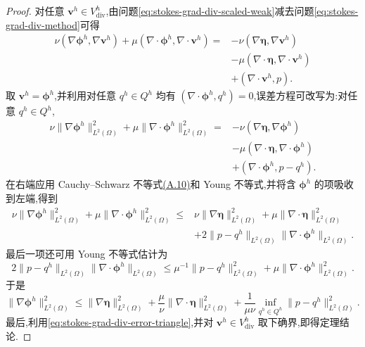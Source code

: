 \begin{proof}
对任意 $\bm{v}^h\in V_{\mathrm{div}}^h$,由问题\cref{eq:stokes-grad-div-scaled-weak}减去问题\cref{eq:stokes-grad-div-method}可得
\begin{align*}
 \nu(\nabla\symbf{\phi}^h,\nabla\bm{v}^h)
  +\mu(\nabla\cdot\symbf{\phi}^h,\nabla\cdot\bm{v}^h)
 ={}&-\nu(\nabla\symbf{\eta},\nabla\bm{v}^h)\\
    &-\mu(\nabla\cdot\symbf{\eta},\nabla\cdot\bm{v}^h)\\
    &+(\nabla\cdot\bm{v}^h,p).
\end{align*}
取 $\bm{v}^h=\symbf{\phi}^h$,并利用对任意 $q^h\in Q^h$ 均有
$(\nabla\cdot\symbf{\phi}^h,q^h)=0$,误差方程可改写为:对任意 $q^h\in Q^h$,
\begin{align*}
 \nu\|\nabla\symbf{\phi}^h\|_{L^2(\Omega)}^2
  +\mu\|\nabla\cdot\symbf{\phi}^h\|_{L^2(\Omega)}^2
 ={}&-\nu(\nabla\symbf{\eta},\nabla\symbf{\phi}^h)\\
    &-\mu(\nabla\cdot\symbf{\eta},\nabla\cdot\symbf{\phi}^h)\\
    &+(\nabla\cdot\symbf{\phi}^h,p-q^h).
\end{align*}
在右端应用 Cauchy--Schwarz 不等式\hyperref[eq:appendix-a-10]{(A.10)}和 Young 不等式,并将含 $\symbf{\phi}^h$ 的项吸收到左端,得到
\begin{equation}\label{eq:stokes-grad-div-error-absorption}
\begin{aligned}
 \nu\|\nabla\symbf{\phi}^h\|_{L^2(\Omega)}^2
  +\mu\|\nabla\cdot\symbf{\phi}^h\|_{L^2(\Omega)}^2
 \leq{}&\nu\|\nabla\symbf{\eta}\|_{L^2(\Omega)}^2
       +\mu\|\nabla\cdot\symbf{\eta}\|_{L^2(\Omega)}^2\\
       &+2\|p-q^h\|_{L^2(\Omega)}
          \|\nabla\cdot\symbf{\phi}^h\|_{L^2(\Omega)}.
\end{aligned}
\end{equation}
最后一项还可用 Young 不等式估计为
\begin{equation}\label{eq:stokes-grad-div-error-pressure-young}
 2\|p-q^h\|_{L^2(\Omega)}
   \|\nabla\cdot\symbf{\phi}^h\|_{L^2(\Omega)}
 \leq \mu^{-1}\|p-q^h\|_{L^2(\Omega)}^2
     +\mu\|\nabla\cdot\symbf{\phi}^h\|_{L^2(\Omega)}^2.
\end{equation}
于是
\[
 \|\nabla\symbf{\phi}^h\|_{L^2(\Omega)}^2
 \leq \|\nabla\symbf{\eta}\|_{L^2(\Omega)}^2
  +\frac{\mu}{\nu}\|\nabla\cdot\symbf{\eta}\|_{L^2(\Omega)}^2
  +\frac{1}{\mu\nu}\inf_{q^h\in Q^h}
        \|p-q^h\|_{L^2(\Omega)}^2.
\]
最后,利用\cref{eq:stokes-grad-div-error-triangle},并对 $\bm{v}^h\in V_{\mathrm{div}}^h$ 取下确界,即得定理结论.
\end{proof}

